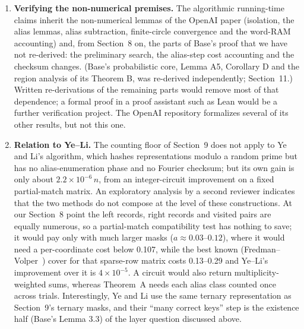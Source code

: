 \documentclass[11pt]{article}
\newcommand{\E}{\mathbb{E}}
\theoremstyle{plain}
\begin{document}
\begin{enumerate}
For amplitude tilting, define, for fixed densities and multiplier $p$, and for $c$ near 1,
\[
\psi(c)=\log_2\int_{\mathbb T}2^{c\lambda(x)+p(\Delta-u(x))}\,dx,
\qquad \lambda(x)=\log_2(2+2\cos x).
\]
Thus $\psi(1)=\log_2 M_1$ and $\psi'(1)=\E_{\nu_1}\lambda$, where $\nu_1$ is the normalized integrand at $c=1$. Also $\partial_p\log_2 M_1=\Delta-\E_{\nu_1}u$. At an interior minimum with respect to $p$, the latter derivative vanishes. This identity alone does not prove a global minimax statement or identify the two moments' maximizing types. In the tested joint optimizations of densities, amplitude tilts, cutoffs and affine certificates, the amplitude coefficient returned to 1. Separate sampling-budget and threshold variations also gave no improvement in the tested model. A rigorous obstruction for these richer estimator families remains open.
\item \textbf{Verifying the non-numerical premises.} The algorithmic running-time claims inherit the non-numerical lemmas of the OpenAI paper (isolation, the alias lemmas, alias subtraction, finite-circle convergence and the word-RAM accounting) and, from Section~8 on, the parts of Base's proof that we have not re-derived: the preliminary search, the alias-step cost accounting and the checksum changes. (Base's probabilistic core, Lemma A5, Corollary D and the region analysis of its Theorem B, was re-derived independently; Section~11.) Written re-derivations of the remaining parts would remove most of that dependence; a formal proof in a proof assistant such as Lean would be a further verification project. The OpenAI repository formalizes several of its other results, but not this one.
\item \textbf{Relation to Ye--Li.} The counting floor of Section~9 does not apply to Ye and Li's algorithm, which hashes representations modulo a random prime but has no alias-enumeration phase and no Fourier checksum; but its own gain is only about $2.2\times10^{-6}\, n$, from an integer-circuit improvement on a fixed partial-match matrix. An exploratory analysis by a second reviewer indicates that the two methods do not compose at the level of these constructions. At our Section~8 point the left records, right records and visited pairs are equally numerous, so a partial-match compatibility test has nothing to save; it would pay only with much larger masks ($a \approx 0.03$--$0.12$), where it would need a per-coordinate cost below 0.107, while the best known (Fredman--Volper~\cite{fv}) cover for that sparse-row matrix costs 0.13--0.29 and Ye--Li's improvement over it is $4\times10^{-5}$. A circuit would also return multiplicity-weighted sums, whereas Theorem~A needs each alias class counted once across trials. Interestingly, Ye and Li use the same ternary representation as Section~9's ternary masks, and their ``many correct keys'' step is the existence half (Base's Lemma 3.3) of the layer question discussed above.
\end{enumerate}
\end{document}
